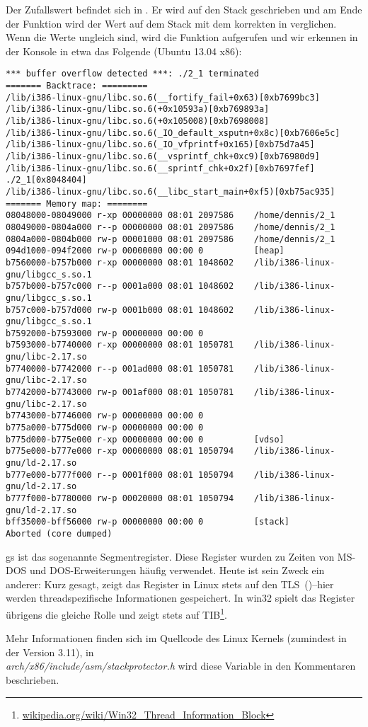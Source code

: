 Der Zufallswert befindet sich in .
Er wird auf den Stack geschrieben und am Ende der Funktion wird der Wert auf dem Stack mit dem korrekten  in
 verglichen.
Wenn die Werte ungleich sind, wird die Funktion  aufgerufen und wir erkennen in der Konsole in
etwa das Folgende (Ubuntu 13.04 x86):

\begin{lstlisting}
*** buffer overflow detected ***: ./2_1 terminated
======= Backtrace: =========
/lib/i386-linux-gnu/libc.so.6(__fortify_fail+0x63)[0xb7699bc3]
/lib/i386-linux-gnu/libc.so.6(+0x10593a)[0xb769893a]
/lib/i386-linux-gnu/libc.so.6(+0x105008)[0xb7698008]
/lib/i386-linux-gnu/libc.so.6(_IO_default_xsputn+0x8c)[0xb7606e5c]
/lib/i386-linux-gnu/libc.so.6(_IO_vfprintf+0x165)[0xb75d7a45]
/lib/i386-linux-gnu/libc.so.6(__vsprintf_chk+0xc9)[0xb76980d9]
/lib/i386-linux-gnu/libc.so.6(__sprintf_chk+0x2f)[0xb7697fef]
./2_1[0x8048404]
/lib/i386-linux-gnu/libc.so.6(__libc_start_main+0xf5)[0xb75ac935]
======= Memory map: ========
08048000-08049000 r-xp 00000000 08:01 2097586    /home/dennis/2_1
08049000-0804a000 r--p 00000000 08:01 2097586    /home/dennis/2_1
0804a000-0804b000 rw-p 00001000 08:01 2097586    /home/dennis/2_1
094d1000-094f2000 rw-p 00000000 00:00 0          [heap]
b7560000-b757b000 r-xp 00000000 08:01 1048602    /lib/i386-linux-gnu/libgcc_s.so.1
b757b000-b757c000 r--p 0001a000 08:01 1048602    /lib/i386-linux-gnu/libgcc_s.so.1
b757c000-b757d000 rw-p 0001b000 08:01 1048602    /lib/i386-linux-gnu/libgcc_s.so.1
b7592000-b7593000 rw-p 00000000 00:00 0
b7593000-b7740000 r-xp 00000000 08:01 1050781    /lib/i386-linux-gnu/libc-2.17.so
b7740000-b7742000 r--p 001ad000 08:01 1050781    /lib/i386-linux-gnu/libc-2.17.so
b7742000-b7743000 rw-p 001af000 08:01 1050781    /lib/i386-linux-gnu/libc-2.17.so
b7743000-b7746000 rw-p 00000000 00:00 0
b775a000-b775d000 rw-p 00000000 00:00 0
b775d000-b775e000 r-xp 00000000 00:00 0          [vdso]
b775e000-b777e000 r-xp 00000000 08:01 1050794    /lib/i386-linux-gnu/ld-2.17.so
b777e000-b777f000 r--p 0001f000 08:01 1050794    /lib/i386-linux-gnu/ld-2.17.so
b777f000-b7780000 rw-p 00020000 08:01 1050794    /lib/i386-linux-gnu/ld-2.17.so
bff35000-bff56000 rw-p 00000000 00:00 0          [stack]
Aborted (core dumped)
\end{lstlisting}

gs ist das sogenannte Segmentregister. Diese Register wurden zu Zeiten von MS-DOS und DOS-Erweiterungen häufig
verwendet. Heute ist sein Zweck ein anderer:
Kurz gesagt, zeigt das  Register in Linux stets auf den \ac{TLS}~()--hier werden threadspezifische
Informationen gespeichert. In win32 spielt das  Register übrigens die gleiche Rolle und zeigt stets auf
\ac{TIB}\footnote{\href{http://go.yurichev.com/17104}{wikipedia.org/wiki/Win32\_Thread\_Information\_Block}}.

Mehr Informationen finden sich im Quellcode des Linux Kernels (zumindest in der Version 3.11), in\\
\emph{arch/x86/include/asm/stackprotector.h} wird diese Variable in den Kommentaren beschrieben.



